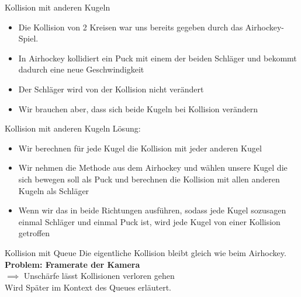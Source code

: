 \begin{frame}{Kollision mit anderen Kugeln}
\begin{itemize}
	\item Die Kollision von 2 Kreisen war uns bereits gegeben durch das Airhockey-Spiel.
	\item In Airhockey kollidiert ein Puck mit einem der beiden Schläger und bekommt dadurch eine neue Geschwindigkeit
	\item Der Schläger wird von der Kollision nicht verändert
	\item Wir brauchen aber, dass sich beide Kugeln bei Kollision verändern
\end{itemize}
\end{frame}
\begin{frame}{Kollision mit anderen Kugeln}
Lösung:
\begin{itemize}
	\item Wir berechnen für jede Kugel die Kollision mit jeder anderen Kugel
	\item Wir nehmen die Methode aus dem Airhockey und wählen unsere Kugel die sich bewegen soll als Puck und berechnen die Kollision mit allen anderen Kugeln als Schläger
	\item Wenn wir das in beide Richtungen ausführen, sodass jede Kugel sozusagen einmal Schläger und einmal Puck ist, wird jede Kugel von einer Kollision getroffen 
\end{itemize}
\end{frame}
\begin{frame}{Kollision mit Queue}
Die eigentliche Kollision bleibt gleich wie beim Airhockey. \\
\textbf{Problem: Framerate der Kamera} \\
$\implies$ Unschärfe lässt Kollisionen verloren gehen \\
Wird Später im Kontext des Queues erläutert.
\end{frame}